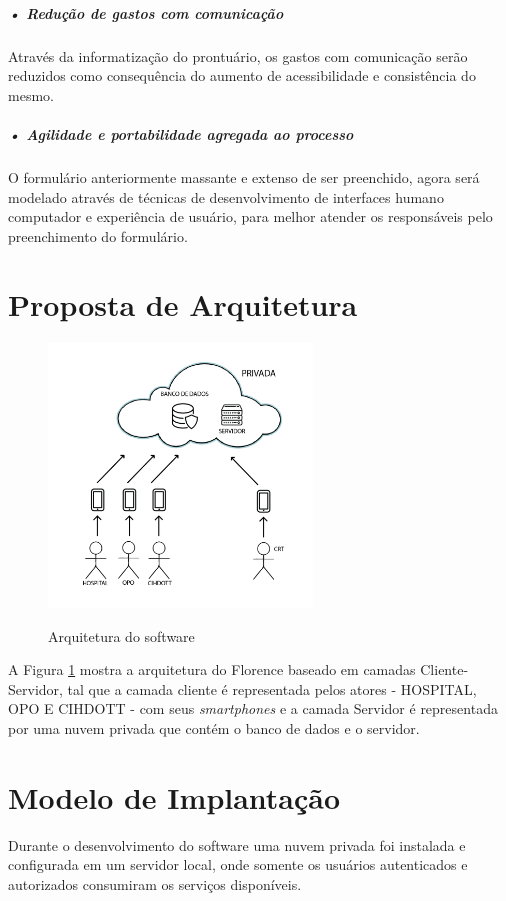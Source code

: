 \documentclass[portuguese,oneside]{tcc}
\begin{document}
\subparagraph{• Redução de gastos com comunicação}

Através da informatização do prontuário, os gastos com comunicação serão reduzidos como consequência do aumento de acessibilidade e consistência do mesmo.

\subparagraph{• Agilidade e portabilidade agregada ao processo}

O formulário anteriormente massante e extenso de ser preenchido, agora será modelado através de técnicas de desenvolvimento de interfaces humano computador e experiência de usuário, para melhor atender os responsáveis pelo preenchimento do formulário.

\section{Proposta de Arquitetura}

\begin{figure}[htp]
\centering
\caption{Arquitetura do software}
\includegraphics[width=7cm]{cliente-servidor}
\label{fig:cliente-servidor}
\end{figure}

A Figura \ref{fig:cliente-servidor} mostra a arquitetura do Florence baseado em camadas Cliente-Servidor, tal que a camada cliente é representada pelos atores - HOSPITAL, OPO E CIHDOTT - com seus \textit{smartphones} e a camada Servidor é representada por uma nuvem privada que contém o banco de dados e o servidor.


\section{Modelo de Implantação}
Durante o desenvolvimento do software uma nuvem privada foi instalada e configurada em um servidor local, onde somente os usuários autenticados e autorizados consumiram os serviços disponíveis.
\end{document}
